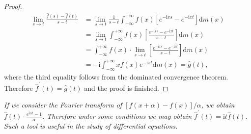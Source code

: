 \begin{proof}
$$\begin{aligned}
\lim_{s\rightarrow t} \frac{\widehat{f}\left( s \right) -\widehat{f}\left( t \right)}{s-t}&=\lim_{s\rightarrow t} \frac{1}{s-t}\int_{-\infty}^{+\infty}{f\left( x \right) \left[ e^{-\mathrm{i}xs}-e^{-\mathrm{i}xt} \right] \mathrm{d}m\left( x \right)}
\\
&=\lim_{s\rightarrow t} \int_{-\infty}^{+\infty}{f\left( x \right) \left[ \frac{e^{-\mathrm{i}xs}-e^{-\mathrm{i}xt}}{s-t} \right] \mathrm{d}m\left( x \right)}
\\
&=\int_{-\infty}^{+\infty}{f\left( x \right) \cdot \lim_{s\rightarrow t} \left[ \frac{e^{-\mathrm{i}xs}-e^{-\mathrm{i}xt}}{s-t} \right] \mathrm{d}m\left( x \right)}
\\
&=-\mathrm{i}\int_{-\infty}^{+\infty}x{f\left( x \right) e^{-\mathrm{i}xt}\mathrm{d}m\left( x \right)}=\widehat{g}\left( t \right) ,
\end{aligned}
$$
where the third equality follows from the dominated convergence theorem. Therefore $\widehat{f}^\prime(t)=\widehat{g}(t)$ and the proof is finished.
\end{proof}
\begin{note}\em
If we consider the Fourier transform of $[f(x+\alpha)-f(x)]/\alpha$, we obtain $\widehat{f}(t)\cdot\frac{e^{\mathrm{i}\alpha t}-1}{\alpha}$. Therefore \textit{under some conditions} we may obtain $\widehat{f}^\prime(t)=\mathrm{i}t\widehat{f}(t)$. Such a tool is useful in the study of differential equations.
\end{note}
